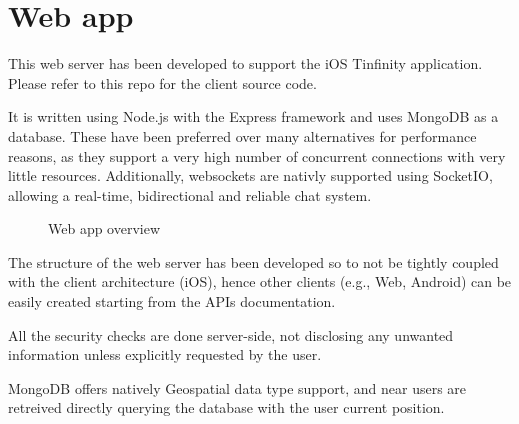  
\section{Web app}
This web server has been developed to support the iOS Tinfinity application. Please refer to this repo for the client source code.

It is written using Node.js with the Express framework and uses MongoDB as a database. These have been preferred over many alternatives for performance reasons, as they support a very high number of concurrent connections with very little resources. Additionally, websockets are nativly supported using SocketIO, allowing a real-time, bidirectional and reliable chat system.

\begin{figure}[H]
\caption{Web app overview}
\end{figure}

The structure of the web server has been developed so to not be tightly coupled with the client architecture (iOS), hence other clients (e.g., Web, Android) can be easily created starting from the APIs documentation.

All the security checks are done server-side, not disclosing any unwanted information unless explicitly requested by the user.

MongoDB offers natively Geospatial data type support, and near users are retreived directly querying the database with the user current position.